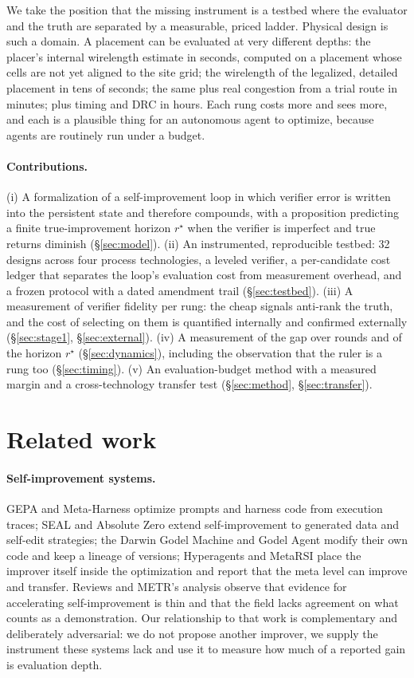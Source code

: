 \documentclass{article}
\begin{document}
We take the position that the missing instrument is a testbed where the evaluator and
the truth are separated by a measurable, priced ladder. Physical design is such a
domain. A placement can be evaluated at very different depths: the placer's internal
wirelength estimate in seconds, computed on a placement whose cells are not yet
aligned to the site grid; the wirelength of the legalized, detailed placement in tens
of seconds; the same plus real congestion from a trial route in minutes; plus timing
and DRC in hours. Each rung costs more and sees more, and each is a plausible thing
for an autonomous agent to optimize, because agents are routinely run under a budget.

\paragraph{Contributions.}
(i) A formalization of a self-improvement loop in which verifier error is written into
the persistent state and therefore compounds, with a proposition predicting a finite
true-improvement horizon $r^\star$ when the verifier is imperfect and true returns
diminish (\S\ref{sec:model}).
(ii) An instrumented, reproducible testbed: 32 designs across four process
technologies, a leveled verifier, a per-candidate cost ledger that separates the
loop's evaluation cost from measurement overhead, and a frozen protocol with a dated
amendment trail (\S\ref{sec:testbed}).
(iii) A measurement of verifier fidelity per rung: the cheap signals anti-rank the
truth, and the cost of selecting on them is quantified internally and confirmed
externally (\S\ref{sec:stage1}, \S\ref{sec:external}).
(iv) A measurement of the gap over rounds and of the horizon $r^\star$
(\S\ref{sec:dynamics}), including the observation that the ruler is a rung too
(\S\ref{sec:timing}).
(v) An evaluation-budget method with a measured margin and a cross-technology
transfer test (\S\ref{sec:method}, \S\ref{sec:transfer}).

\section{Related work}

\paragraph{Self-improvement systems.} GEPA and Meta-Harness optimize prompts and
harness code from execution traces; SEAL and Absolute Zero extend self-improvement to
generated data and self-edit strategies; the Darwin Godel Machine and Godel Agent
modify their own code and keep a lineage of versions; Hyperagents and MetaRSI place
the improver itself inside the optimization and report that the meta level can improve
and transfer. Reviews and METR's analysis observe that evidence for accelerating
self-improvement is thin and that the field lacks agreement on what counts as a
demonstration. Our relationship to that work is complementary and deliberately
adversarial: we do not propose another improver, we supply the instrument these
systems lack and use it to measure how much of a reported gain is evaluation depth.
\end{document}
